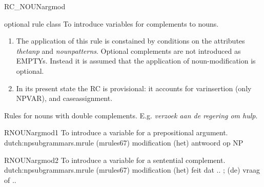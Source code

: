 \begin{mruleclass}{RC\_NOUNargmod}
\begin{classdescr}
\kind optional rule class
\classtask To introduce variables for complements to nouns.
\classremarks\mbox{}\\
\begin{enumerate}
  \item 
The application of this rule is constained by  conditions on the attributes 
{\em 
thetanp} and {\em nounpatterns}. Optional complements are not introduced as 
EMPTYs. Instead it is assumed that the application of 
noun-modification is optional.
  \item
In its present state the RC is provisional: it accounts for 
 varinsertion (only NPVAR), and   caseassignment.
\end{enumerate}
\nofilters

\nospeedrules

\begin{plannedrules}
\item
Rules for nouns with double complements. E.g. {\em verzoek aan de regering om 
hulp}.
\end{plannedrules}
\norulesnotince


\end{classdescr}

\begin{members}
   
\begin{member}
 RNOUNargmod1
 To introduce a variable for a prepositional argument.
\file dutch:npsubgrammars.mrule (mrules67)
\semantics modification
\example (het) antwoord op NP
\remarks\mbox{}

\end{member}
   
\begin{member}
 RNOUNargmod2
 To introduce a variable for a sentential complement.
\file dutch:npsubgrammars.mrule (mrules67)
\semantics modification
\example  (het) feit dat .. ; (de) vraag of ..
\remarks\mbox{}

\end{member}
\end{members}
\end{mruleclass}

